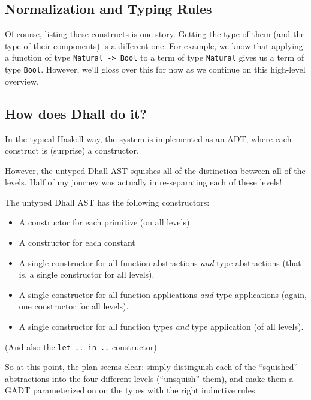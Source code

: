 \documentclass[]{article}
\begin{document}
\subsection{Normalization and Typing
Rules}\label{normalization-and-typing-rules}

Of course, listing these constructs is one story. Getting the type of them (and
the type of their components) is a different one. For example, we know that
applying a function of type \texttt{Natural\ -\textgreater{}\ Bool} to a term of
type \texttt{Natural} gives us a term of type \texttt{Bool}. However, we'll
gloss over this for now as we continue on this high-level overview.

\subsection{How does Dhall do it?}\label{how-does-dhall-do-it}

In the typical Haskell way, the system is implemented as an ADT, where each
construct is (surprise) a constructor.

However, the untyped Dhall AST squishes all of the distinction between all of
the levels. Half of my journey was actually in re-separating each of these
levels!

The untyped Dhall AST has the following constructors:

\begin{itemize}
\tightlist
\item
  A constructor for each primitive (on all levels)
\item
  A constructor for each constant
\item
  A single constructor for all function abstractions \emph{and} type
  abstractions (that is, a single constructor for all levels).
\item
  A single constructor for all function applications \emph{and} type
  applications (again, one constructor for all levels).
\item
  A single constructor for all function types \emph{and} type application (of
  all levels).
\end{itemize}

(And also the \texttt{let\ ..\ in\ ..} constructor)

So at this point, the plan seems clear: simply distinguish each of the
``squished'' abstractions into the four different levels (``unsquish'' them),
and make them a GADT parameterized on on the types with the right inductive
rules.
\end{document}
